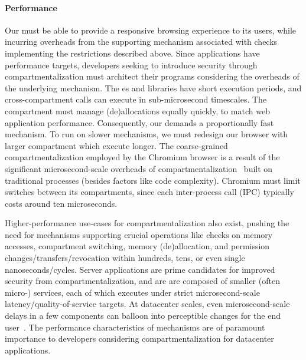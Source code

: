 \paragraph{Performance}
Our \browser must be able to provide a responsive browsing experience to its 
users, while incurring overheads from the supporting mechanism associated with 
checks implementing the restrictions described above.
Since applications have performance targets, developers seeking to introduce 
security through compartmentalization must architect their programs considering 
the overheads of the underlying mechanism.
The \sandbox{}es and \nested libraries have short execution periods, and
cross-compartment calls can execute in sub-microsecond timescales.
The \manager compartment must manage (de)allocations equally quickly, to
match web application performance.
Consequently, our \browser demands a proportionally fast mechanism.
To run on slower mechanisms, we must redesign our browser with larger 
compartment which execute longer.
The coarse-grained compartmentalization employed by the Chromium browser
is a result of the significant microsecond-scale overheads of 
compartmentalization~\cite{LittonVE0BD16} built on 
traditional processes (besides factors like code complexity).
Chromium must limit switches between its compartments, since each
inter-process call (IPC) typically costs around ten microseconds.

Higher-performance use-cases for compartmentalization also exist, pushing
the need for mechanisms supporting crucial operations like checks on 
memory accesses, compartment switching, memory (de)allocation, and 
permission changes/transfers/revocation within hundreds, tens, or even single
nanoseconds/cycles.
Server applications are prime candidates for improved security from 
compartmentalization, and are are composed of smaller (often micro-) services,
each of which executes under strict microsecond-scale latency/quality-of-service 
targets.
At datacenter scales, even microsecond-scale delays in a few components can 
balloon into perceptible changes for the end user~\cite{LiSPG14, DeanB13}.
The performance characteristics of mechanisms are of paramount importance to
developers considering compartmentalization for datacenter applications.

